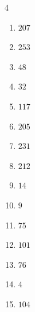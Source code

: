 \begin{multicols}{4}
\begin{enumerate}

  \item $207$


  \item $253$


  \item $48$


  \item $32$


  \item $117$


  \item $205$


  \item $231$


  \item $212$


\columnbreak %

  \item $14$


  \item $9$


  \item $75$


  \item $101$


  \item $76$


  \item $4$


  \item $104$



\end{enumerate}
\end{multicols}
